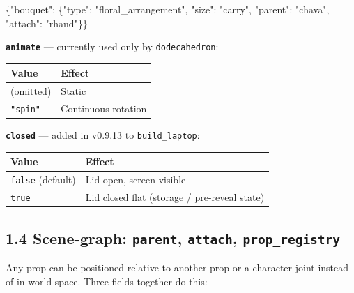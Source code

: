 \documentclass[
  12pt,
  letterpaper,
]{book}
\newenvironment{Shaded}{}{}
\newcommand{\DataTypeTok}[1]{\textcolor[rgb]{0.56,0.13,0.00}{#1}}
\newcommand{\FunctionTok}[1]{\textcolor[rgb]{0.02,0.16,0.49}{#1}}
\newcommand{\StringTok}[1]{\textcolor[rgb]{0.25,0.44,0.63}{#1}}
\begin{document}
\begin{Shaded}
\begin{Highlighting}[]
\FunctionTok{\{}\DataTypeTok{"bouquet"}\FunctionTok{:} \FunctionTok{\{}\DataTypeTok{"type"}\FunctionTok{:} \StringTok{"floral\_arrangement"}\FunctionTok{,} \DataTypeTok{"size"}\FunctionTok{:} \StringTok{"carry"}\FunctionTok{,}
             \DataTypeTok{"parent"}\FunctionTok{:} \StringTok{"chava"}\FunctionTok{,} \DataTypeTok{"attach"}\FunctionTok{:} \StringTok{"rhand"}\FunctionTok{\}\}}
\end{Highlighting}
\end{Shaded}

\textbf{\texttt{animate}} --- currently used only by
\texttt{dodecahedron}:

\begin{longtable}[]{@{}ll@{}}
\toprule\noalign{}
Value & Effect \\
\midrule\noalign{}
\endhead
\bottomrule\noalign{}
\endlastfoot
(omitted) & Static \\
\texttt{"spin"} & Continuous rotation \\
\end{longtable}

\textbf{\texttt{closed}} --- added in v0.9.13 to \texttt{build\_laptop}:

\begin{longtable}[]{@{}ll@{}}
\toprule\noalign{}
Value & Effect \\
\midrule\noalign{}
\endhead
\bottomrule\noalign{}
\endlastfoot
\texttt{false} (default) & Lid open, screen visible \\
\texttt{true} & Lid closed flat (storage / pre-reveal state) \\
\end{longtable}

\subsection{\texorpdfstring{1.4 Scene-graph: \texttt{parent},
\texttt{attach},
\texttt{prop\_registry}}{1.4 Scene-graph: parent, attach, prop\_registry}}\label{scene-graph-parent-attach-prop_registry}

Any prop can be positioned relative to another prop or a character joint
instead of in world space. Three fields together do this:
\end{document}
